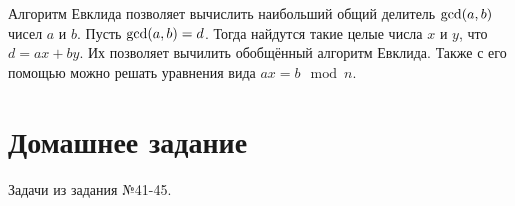 \documentclass[12pt, leqno]{article}
\theoremstyle{definiton}
\theoremstyle{definition}
\theoremstyle{definition}
\begin{document}
Алгоритм Евклида позволяет вычислить наибольший общий делитель ${\rm gcd}(a,b)$ чисел $a$ и $b$. Пусть ${\rm gcd}(a,b) = d$. Тогда найдутся такие целые числа $x$ и $y$, что $d = ax + by$. Их позволяет вычилить обобщённый алгоритм Евклида. Также с его помощью можно решать уравнения вида $ax  = b \mod n$.




\section{Домашнее задание}

Задачи из задания №41-45.
\end{document}
